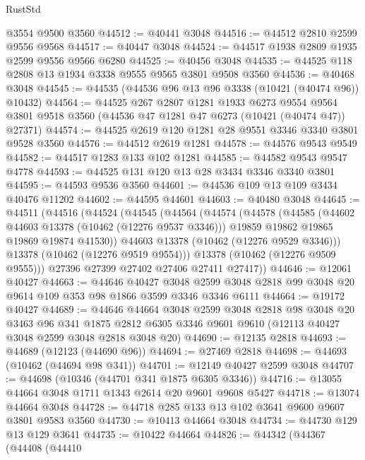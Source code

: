 \begin{lexlean}{RustStd}
\begin{coremodule}
    @3554
    @9500
    @3560
@44512 := @40441 @3048
@44516 := @44512 @2810 @2599 @9556 @9568
@44517 := @40447 @3048
@44524 := @44517 @1938 @2809 @1935 @2599 @9556 @9566 @6280
@44525 := @40456 @3048
@44535 := @44525 @118 @2808 @13 @1934 @3338 @9555 @9565 @3801 @9508 @3560
@44536 := @40468 @3048
@44545 := @44535 (@44536 @96 @13 @96 @3338 (@10421 (@40474 @96)) @10432)
@44564 := @44525
    @267
    @2807
    @1281
    @1933
    @6273
    @9554
    @9564
    @3801
    @9518
    @3560
    (@44536 @47 @1281 @47 @6273 (@10421 (@40474 @47)) @27371)
@44574 := @44525 @2619 @120 @1281 @28 @9551 @3346 @3340 @3801 @9528 @3560
@44576 := @44512 @2619 @1281
@44578 := @44576 @9543 @9549
@44582 := @44517 @1283 @133 @102 @1281
@44585 := @44582 @9543 @9547 @4778
@44593 := @44525 @131 @120 @13 @28 @3434 @3346 @3340 @3801
@44595 := @44593 @9536 @3560
@44601 := @44536 @109 @13 @109 @3434 @40476 @11202
@44602 := @44595 @44601
@44603 := @40480 @3048
@44645 := @44511
    (@44516
      (@44524
        (@44545
          (@44564
            (@44574
              (@44578
                (@44585
                  (@44602 @44603 @13378 (@10462 (@12276 @9537 @3346)))
                  @19859
                  @19862
                  @19865
                  @19869
                  @19874
                  @41530))
              @44603
              @13378
              (@10462 (@12276 @9529 @3346)))
            @13378
            (@10462 (@12276 @9519 @9554)))
          @13378
          (@10462 (@12276 @9509 @9555)))
        @27396
        @27399
        @27402
        @27406
        @27411
        @27417))
@44646 := @12061 @40427
@44663 := @44646
    @40427
    @3048
    @2599
    @3048
    @2818
    @99
    @3048
    @20
    @9614
    @109
    @353
    @98
    @1866
    @3599
    @3346
    @3346
    @6111
@44664 := @19172 @40427
@44689 := @44646
    @44664
    @3048
    @2599
    @3048
    @2818
    @98
    @3048
    @20
    @3463
    @96
    @341
    @1875
    @2812
    @6305
    @3346
    @9601
    @9610
    (@12113 @40427 @3048 @2599 @3048 @2818 @3048 @20)
@44690 := @12135 @2818
@44693 := @44689 (@12123 (@44690 @96))
@44694 := @27469 @2818
@44698 := @44693 (@10462 (@44694 @98 @341))
@44701 := @12149 @40427 @2599 @3048
@44707 := @44698 (@10346 (@44701 @341 @1875 @6305 @3346))
@44716 := @13055 @44664 @3048 @1711 @1343 @2614 @20 @9601 @9608 @5427
@44718 := @13074 @44664 @3048
@44728 := @44718 @285 @133 @13 @102 @3641 @9600 @9607 @3801 @9583 @3560
@44730 := @10413 @44664 @3048
@44734 := @44730 @129 @13 @129 @3641
@44735 := @10422 @44664
@44826 := @44342
    (@44367
      (@44408
        (@44410

\end{coremodule}
\end{lexlean}
